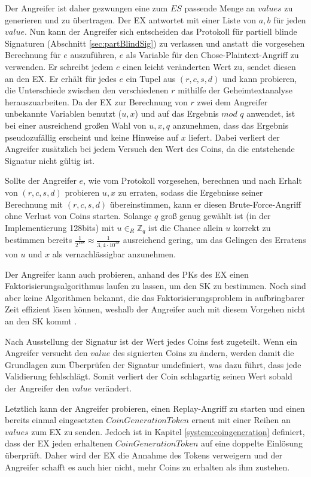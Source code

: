 \documentclass[
	fontsize=11pt,
	headings=small,
	parskip=half,           %
	bibliography=totoc,
	numbers=noenddot,       %
	open=any,               %
]{scrreprt}
\begin{document}
Der Angreifer ist daher gezwungen eine zum $ES$ passende Menge an $values$ zu generieren und zu übertragen. Der EX antwortet mit einer Liste von $a,b$ für jeden $value$. Nun kann der Angreifer sich entscheiden das Protokoll für partiell blinde Signaturen (Abschnitt \ref{sec:partBlindSig}) zu verlassen und anstatt die vorgesehen Berechnung für $e$ auszuführen, $e$ als Variable für den Chose-Plaintext-Angriff zu verwenden. Er schreibt jedem $e$ einen leicht veränderten Wert zu, sendet diesen an den EX. Er erhält für jedes $e$ ein Tupel aus $(r,c,s,d)$ und kann probieren, die Unterschiede zwischen den verschiedenen $r$ mithilfe der Geheimtextanalyse herauszuarbeiten. Da der EX zur Berechnung von $r$ zwei dem Angreifer unbekannte Variablen benutzt ($u,x$) und auf das Ergebnis $mod$ $q$ anwendet, ist bei einer ausreichend großen Wahl von $u,x,q$ anzunehmen, dass das Ergebnis pseudozufällig erscheint und keine Hinweise auf $x$ liefert. Dabei verliert der Angreifer zusätzlich bei jedem Versuch den Wert des Coins, da die entstehende Signatur nicht gültig ist.

Sollte der Angreifer $e$, wie vom Protokoll vorgesehen, berechnen und nach Erhalt von $(r,c,s,d)$ probieren $u,x$ zu erraten, sodass die Ergebnisse seiner Berechnung mit $(r,c,s,d)$ übereinstimmen, kann er diesen Brute-Force-Angriff ohne Verlust von Coins starten. Solange $q$ groß genug gewählt ist (in der Implementierung 128bits) mit $u{\in}_{R} {\mathbb{Z}}_{q}$ ist die Chance allein $u$ korrekt zu bestimmen bereits $\frac{1}{2^{128}} \approx \frac{1}{3,4\cdot10^{38}}$ ausreichend gering, um das Gelingen des Erratens von $u$ und $x$ als vernachlässigbar anzunehmen.

Der Angreifer kann auch probieren, anhand des PKs des EX einen Faktorisierungsalgorithmus laufen zu lassen, um den SK zu bestimmen. Noch sind aber keine Algorithmen bekannt, die das Faktorisierungsproblem in aufbringbarer Zeit effizient lösen können, weshalb der Angreifer auch mit diesem Vorgehen nicht an den SK kommt \cite{montgomery1994survey}.

Nach Ausstellung der Signatur ist der Wert jedes Coins fest zugeteilt. Wenn ein Angreifer versucht den $value$ des signierten Coins zu ändern, werden damit die Grundlagen zum Überprüfen der Signatur umdefiniert, was dazu führt, dass jede Validierung fehlschlägt. Somit verliert der Coin schlagartig seinen Wert sobald der Angreifer den $value$ verändert.

Letztlich kann der Angreifer probieren, einen Replay-Angriff zu starten und einen bereits einmal eingesetzten $CoinGenerationToken$ erneut mit einer Reihen an $values$ zum EX zu senden. Jedoch ist in Kapitel \ref{system:coingeneration} definiert, dass der EX jeden erhaltenen $CoinGenerationToken$ auf eine doppelte Einlösung überprüft. Daher wird der EX die Annahme des Tokens verweigern und der Angreifer schafft es auch hier nicht, mehr Coins zu erhalten als ihm zustehen.
\end{document}
